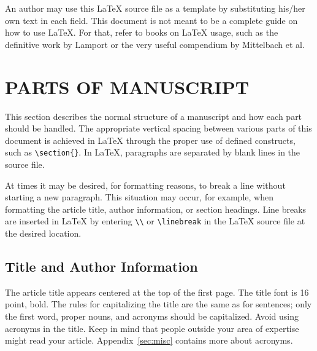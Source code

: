 \documentclass[]{spie}  %
\begin{document}
An author may use this LaTeX source file as a template by substituting his/her own text in each field.  This document is not meant to be a complete guide on how to use LaTeX.  For that, refer to books on LaTeX usage, such as the definitive work by Lamport\cite{Lamport94} or the very useful compendium by Mittelbach et al.\cite{Mittelbach04}

\section{PARTS OF MANUSCRIPT} 

This section describes the normal structure of a manuscript and how each part should be handled.  The appropriate vertical spacing between various parts of this document is achieved in LaTeX through the proper use of defined constructs, such as \verb|\section{}|.  In LaTeX, paragraphs are separated by blank lines in the source file. 

At times it may be desired, for formatting reasons, to break a line without starting a new paragraph.  This situation may occur, for example, when formatting the article title, author information, or section headings.  Line breaks are inserted in LaTeX by entering \verb|\\| or \verb|\linebreak| in the LaTeX source file at the desired location.  


\subsection{Title and Author Information} 
\label{sec:title}

The article title appears centered at the top of the first page.  The title font is 16 point, bold.  The rules for capitalizing the title are the same as for sentences; only the first word, proper nouns, and acronyms should be capitalized.  Avoid using acronyms in the title.  Keep in mind that people outside your area of expertise might read your article.  Appendix~\ref{sec:misc} contains more about acronyms.
\end{document}
